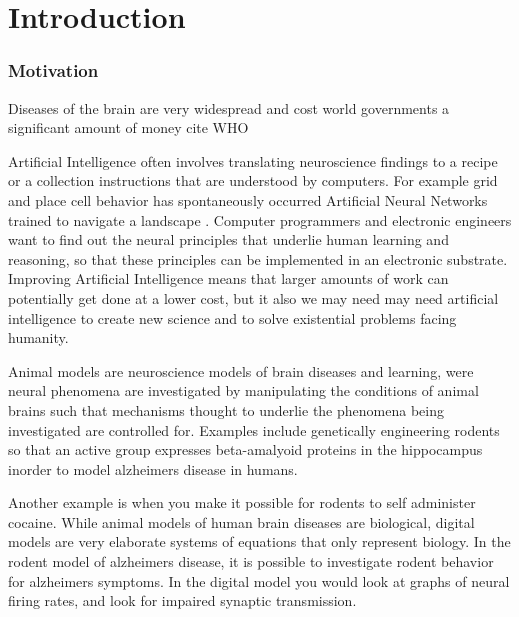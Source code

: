 
\section{Introduction}

\subsubsection{Motivation}

Diseases of the brain are very widespread and cost world governments a significant amount of money cite WHO



Artificial Intelligence often involves translating neuroscience findings to a recipe or a collection instructions that are understood by computers. For example grid and place cell behavior has spontaneously occurred Artificial Neural Networks trained to navigate a landscape \cite{banino2018vector}. Computer programmers and electronic engineers want to find out the neural principles that underlie human learning and reasoning, so that these principles can be implemented in an electronic substrate. Improving Artificial Intelligence means that larger amounts of work can potentially get done at a lower cost, but it also we may need may need artificial intelligence to create new science and to solve existential problems facing humanity.

Animal models are neuroscience models of brain diseases and learning, were neural phenomena are investigated by manipulating the conditions of animal brains such that mechanisms thought to underlie the phenomena being investigated are controlled for. Examples include genetically engineering rodents so that an active group expresses beta-amalyoid proteins in the hippocampus inorder to model alzheimers disease in humans.

Another example is when you make it possible for rodents to self administer cocaine. While animal models of human brain diseases are biological, digital models are very elaborate systems of equations that only represent biology. In the rodent model of alzheimers disease, it is possible to investigate rodent behavior for alzheimers symptoms. In the digital model you would look at graphs of neural firing rates, and look for impaired synaptic transmission.

